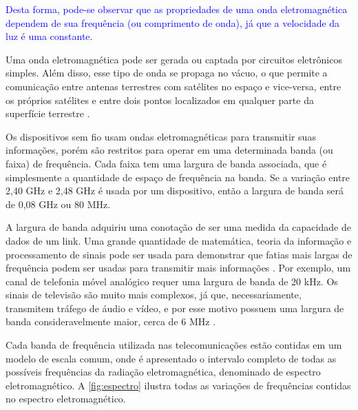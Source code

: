 \textcolor{blue}{Desta forma, pode-se observar que as propriedades de uma onda eletromagnética dependem de sua frequência (ou comprimento de onda), já que a velocidade da luz é uma constante.}

\begin{figure}[H]
	\centering
\end{figure}

Uma onda eletromagnética pode ser gerada ou captada por circuitos eletrônicos simples. Além disso, esse tipo de onda se propaga no vácuo, o que permite a comunicação entre antenas terrestres com satélites no espaço e vice-versa, entre os próprios satélites e entre dois pontos localizados em qualquer parte da superfície terrestre \cite{fluminense2010}.

Os dispositivos sem fio usam ondas eletromagnéticas para transmitir suas informações, porém são restritos para operar em uma determinada banda (ou faixa) de frequência. Cada faixa tem uma largura de banda associada, que é simplesmente a quantidade de espaço de frequência na banda. Se a variação entre 2,40 GHz e 2,48 GHz é usada por um dispositivo, então a largura de banda será de 0,08 GHz ou 80 MHz.

A largura de banda adquiriu uma conotação de ser uma medida da capacidade de dados de um link. Uma grande quantidade de matemática, teoria da informação e processamento de sinais pode ser usada para demonstrar que fatias mais largas de frequência podem ser usadas para transmitir mais informações \cite{gast2002}. Por exemplo, um canal de telefonia móvel analógico requer uma largura de banda de 20 kHz. Os sinais de televisão são muito mais complexos, já que, necessariamente, transmitem tráfego de áudio e vídeo, e por esse motivo possuem uma largura de banda consideravelmente maior, cerca de 6 MHz \cite{gast2002}.

Cada banda de frequência utilizada nas telecomunicações estão contidas em um modelo de escala comum, onde é apresentado o intervalo completo de todas as possíveis frequências da radiação eletromagnética, denominado de espectro eletromagnético. A \autoref{fig:espectro} ilustra todas as variações de frequências contidas no espectro eletromagnético.

